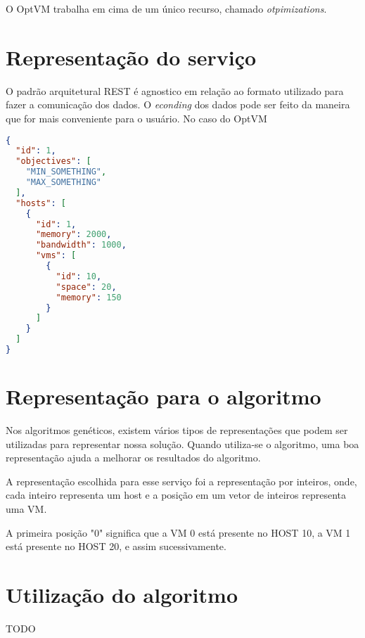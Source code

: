 O OptVM trabalha em cima de um único recurso, chamado \textit{otpimizations}.

\section{Representação do serviço}

O padrão arquitetural REST é agnostico em relação ao formato utilizado para fazer a comunicação dos dados. O \textit{econding} 
dos dados pode ser feito da maneira que for mais conveniente para o usuário. No caso do OptVM

\begin{lstlisting}[language=json,firstnumber=1]
{
  "id": 1,
  "objectives": [
    "MIN_SOMETHING",
    "MAX_SOMETHING"
  ],
  "hosts": [
    {
      "id": 1,
      "memory": 2000,
      "bandwidth": 1000,
      "vms": [
        {
          "id": 10,
          "space": 20,
          "memory": 150
        }
      ]
    }
  ]
}
\end{lstlisting}

\section{Representação para o algoritmo}

Nos algoritmos genéticos, existem vários tipos de representações que podem ser utilizadas para representar nossa solução. Quando utiliza-se
o algoritmo, uma boa representação ajuda a melhorar os resultados do algoritmo. 

A representação escolhida para esse serviço foi a representação por inteiros, onde, cada inteiro representa um host e 
a posição em um vetor de inteiros representa uma VM.

A primeira posição "0" significa que a VM 0 está presente no HOST 10, a VM 1 está presente no HOST 20, e assim sucessivamente.

\section{Utilização do algoritmo}

TODO